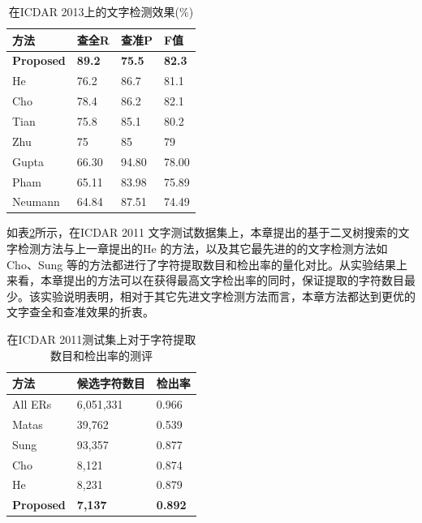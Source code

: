         \begin{table}[!h]
        \centering
        \caption{在ICDAR 2013上的文字检测效果(\%)}
        \begin{tabular}{p{}p{} p{} p{}}
        \toprule
        方法 & 查全R & 查准P & F值 \\
        \midrule
        \textbf{Proposed} & \textbf{89.2} & \textbf{75.5} & \textbf{82.3}\\
        He\cite{He2017scene} & 76.2 & 86.7 & 81.1 \\
        Cho\cite{Cho2016Canny} & 78.4 & 86.2 & 82.1 \\
        Tian\cite{Tian2016Text} & 75.8 & 85.1 & 80.2 \\
        Zhu\cite{Zhu2016Text} & 75 & 85 & 79 \\
        Gupta\cite{Gupta2016Synthetic} & 66.30 & 94.80 & 78.00 \\
        Pham\cite{Pham2016Robust} & 65.11 & 83.98 & 75.89 \\
        Neumann\cite{Neumann2012Real} & 64.84 & 87.51 & 74.49 \\
        \bottomrule
        \end{tabular}
        \label{tab.c4_icdar13}
        \end{table}

        如表\ref{tab.c4_icdar11}所示，在ICDAR 2011 文字测试数据集上，本章提出的基于二叉树搜索的文字检测方法与上一章提出的He\cite{He2017scene} 的方法，以及其它最先进的的文字检测方法如Cho\cite{Cho2016Canny}、Sung\cite{Sung2015Scene} 等的方法都进行了字符提取数目和检出率的量化对比。从实验结果上来看，本章提出的方法可以在获得最高文字检出率的同时，保证提取的字符数目最少。该实验说明表明，相对于其它先进文字检测方法而言，本章方法都达到更优的文字查全和查准效果的折衷。

        \begin{table}[!h]
        \centering
        \caption{在ICDAR 2011测试集上对于字符提取数目和检出率的测评}
        \begin{tabular}{p{} p{} p{}}
        \toprule
        方法 & 候选字符数目 & 检出率 \\
        \midrule
        All ERs & 6,051,331 & 0.966 \\
        Matas\cite{Matas2004Robust} & 39,762 & 0.539 \\
        Sung\cite{Sung2015Scene} & 93,357 & 0.877  \\
        Cho\cite{Cho2016Canny} & 8,121 & 0.874 \\
        He\cite{He2017scene} & 8,231 & 0.879 \\
        \textbf{Proposed} & \textbf{7,137} & \textbf{0.892} \\
        \bottomrule
        \end{tabular}
        \label{tab.c4_icdar11}
        \end{table}

